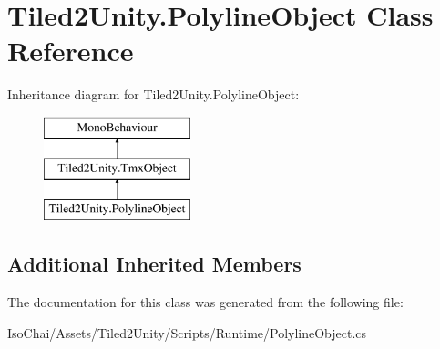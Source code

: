 \hypertarget{class_tiled2_unity_1_1_polyline_object}{}\section{Tiled2\+Unity.\+Polyline\+Object Class Reference}
\label{class_tiled2_unity_1_1_polyline_object}
Inheritance diagram for Tiled2\+Unity.\+Polyline\+Object\+:\begin{figure}[H]
\begin{center}
\leavevmode
\includegraphics[height=3.000000cm]{class_tiled2_unity_1_1_polyline_object}
\end{center}
\end{figure}
\subsection*{Additional Inherited Members}


The documentation for this class was generated from the following file\+:\begin{DoxyCompactItemize}
\item 
Iso\+Chai/\+Assets/\+Tiled2\+Unity/\+Scripts/\+Runtime/Polyline\+Object.\+cs\end{DoxyCompactItemize}
